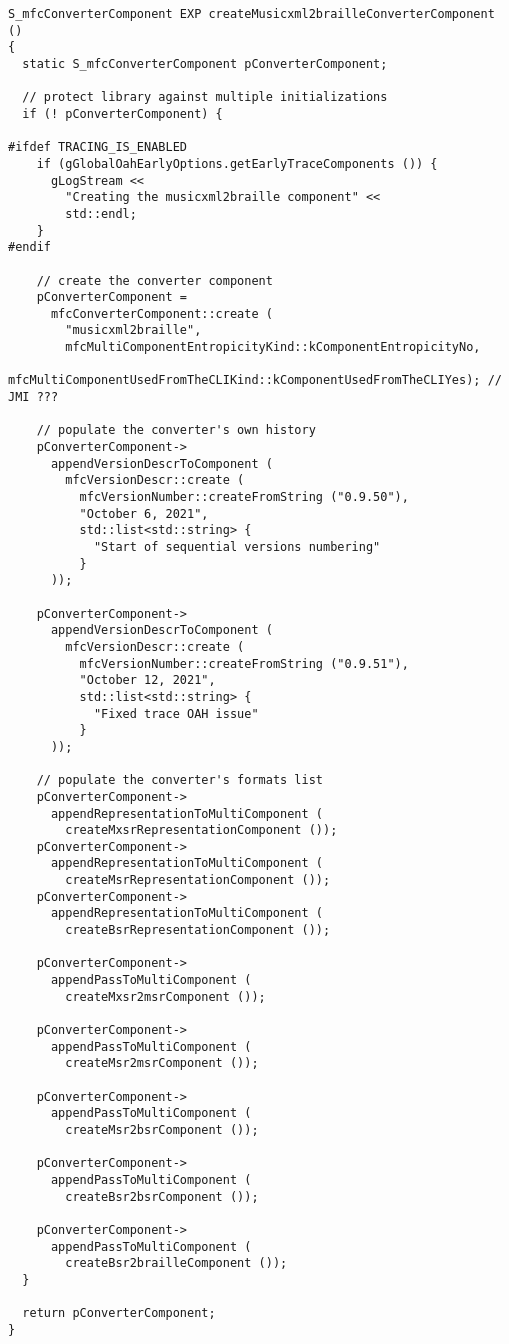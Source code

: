 \begin{lstlisting}[language=CPlusPlus]
S_mfcConverterComponent EXP createMusicxml2brailleConverterComponent ()
{
  static S_mfcConverterComponent pConverterComponent;

  // protect library against multiple initializations
  if (! pConverterComponent) {

#ifdef TRACING_IS_ENABLED
    if (gGlobalOahEarlyOptions.getEarlyTraceComponents ()) {
      gLogStream <<
        "Creating the musicxml2braille component" <<
        std::endl;
    }
#endif

    // create the converter component
    pConverterComponent =
      mfcConverterComponent::create (
        "musicxml2braille",
        mfcMultiComponentEntropicityKind::kComponentEntropicityNo,
        mfcMultiComponentUsedFromTheCLIKind::kComponentUsedFromTheCLIYes); // JMI ???

    // populate the converter's own history
    pConverterComponent->
      appendVersionDescrToComponent (
        mfcVersionDescr::create (
          mfcVersionNumber::createFromString ("0.9.50"),
          "October 6, 2021",
          std::list<std::string> {
            "Start of sequential versions numbering"
          }
      ));

    pConverterComponent->
      appendVersionDescrToComponent (
        mfcVersionDescr::create (
          mfcVersionNumber::createFromString ("0.9.51"),
          "October 12, 2021",
          std::list<std::string> {
            "Fixed trace OAH issue"
          }
      ));

    // populate the converter's formats list
    pConverterComponent->
      appendRepresentationToMultiComponent (
        createMxsrRepresentationComponent ());
    pConverterComponent->
      appendRepresentationToMultiComponent (
        createMsrRepresentationComponent ());
    pConverterComponent->
      appendRepresentationToMultiComponent (
        createBsrRepresentationComponent ());

    pConverterComponent->
      appendPassToMultiComponent (
        createMxsr2msrComponent ());

    pConverterComponent->
      appendPassToMultiComponent (
        createMsr2msrComponent ());

    pConverterComponent->
      appendPassToMultiComponent (
        createMsr2bsrComponent ());

    pConverterComponent->
      appendPassToMultiComponent (
        createBsr2bsrComponent ());

    pConverterComponent->
      appendPassToMultiComponent (
        createBsr2brailleComponent ());
  }

  return pConverterComponent;
}
\end{lstlisting}


